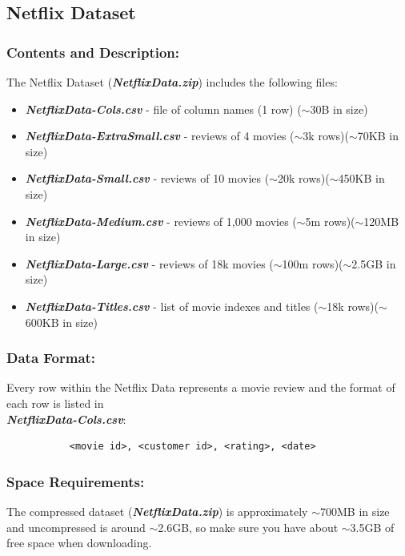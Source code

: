 \documentclass{article}
\begin{document}
\subsection{Netflix Dataset}

\subsubsection*{Contents and Description:}
The Netflix Dataset (\textbf{\textit{NetflixData.zip}}) includes the following files:
\begin{itemize}
    \item \textit{\textbf{NetflixData-Cols.csv}} - file of column names (1 row) ($\sim$30B in size)
    \item \textit{\textbf{NetflixData-ExtraSmall.csv}} - reviews of 4 movies ($\sim$3k rows)($\sim$70KB in size)
    \item \textit{\textbf{NetflixData-Small.csv}} - reviews of 10 movies ($\sim$20k rows)($\sim$450KB in size)
    \item \textit{\textbf{NetflixData-Medium.csv}} - reviews of 1,000 movies ($\sim$5m rows)($\sim$120MB in size)
    \item \textit{\textbf{NetflixData-Large.csv}} - reviews of 18k movies ($\sim$100m rows)($\sim$2.5GB in size)
    \item \textit{\textbf{NetflixData-Titles.csv}} - list of movie indexes and titles ($\sim$18k rows)($\sim$600KB in size)
\end{itemize}

\subsubsection*{Data Format:}
Every row within the Netflix Data represents a movie review and the format of each row is listed in \\ \textbf{\textit{NetflixData-Cols.csv}}:

\large
\begin{verbatim}
           <movie id>, <customer id>, <rating>, <date>
\end{verbatim}
\normalsize

\subsubsection*{Space Requirements:}
The compressed dataset (\textbf{\textit{NetflixData.zip}}) is approximately $\sim$700MB in size and uncompressed is around $\sim$2.6GB, so make sure you have about $\sim$3.5GB of free space when downloading.
\end{document}
